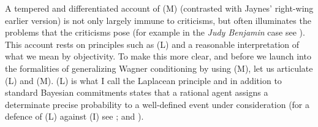 \documentclass[11pt]{article}
\begin{document}


A tempered and differentiated account of (M) (contrasted with Jaynes'
right-wing earlier version) is not only largely immune to criticisms,
but often illuminates the problems that the criticisms pose (for
example in the \emph{Judy Benjamin} case see ).
This account rests on principles such as (L) and a reasonable
interpretation of what we mean by objectivity. To make this more
clear, and before we launch into the formalities of generalizing
Wagner conditioning by using (M), let us articulate (L) and (M). (L)
is what I call the Laplacean principle and in addition to standard
Bayesian commitments states that a rational agent assigns a
determinate precise probability to a well-defined event under
consideration (for a defence of (L) against (I) see
; and ).


\end{document}
